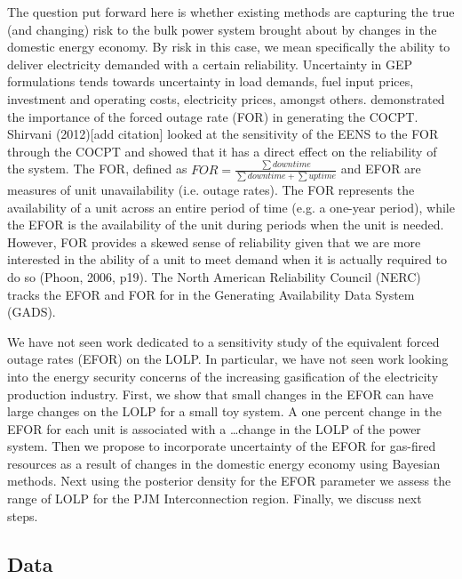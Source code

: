 \documentclass[10pt]{amsart}
\begin{document}
	The question put forward here is whether existing methods are capturing the true (and changing) risk to the bulk power system brought about by changes in the domestic energy economy. 
	By risk in this case, we mean specifically the ability to deliver electricity demanded with a certain reliability. 
	Uncertainty in GEP formulations tends towards uncertainty in load demands, fuel input prices, investment and operating costs, electricity prices, amongst others.
	\parencite{} demonstrated the importance of the forced outage rate (FOR) in generating the COCPT. 
	Shirvani (2012)[add citation] looked at the sensitivity of the EENS to the FOR through the COCPT and showed that it has a direct effect on the reliability of the system. 
	The FOR, defined as $FOR = \frac{\sum down time}{\sum down time + \sum up time}$ and EFOR are measures of unit unavailability (i.e. outage rates). 
	The FOR represents the availability of a unit across an entire period of time (e.g. a one-year period), while the EFOR is the availability of the unit during periods when the unit is needed.
	However, FOR provides a skewed sense of reliability given that we are more interested in the ability of a unit to meet demand when it is actually required to do so (Phoon, 2006, p19).  
	The North American Reliability Council (NERC) tracks the EFOR and FOR for in the Generating Availability Data System (GADS).
	
	We have not seen work dedicated to a sensitivity study of the equivalent forced outage rates (EFOR) on the LOLP.
	In particular, we have not seen work looking into the energy security concerns of the increasing gasification of the electricity production industry.
	First, we show that small changes in the EFOR can have large changes on the LOLP for a small toy system.
	A one percent change in the EFOR for each unit is associated with a \ldots change in the LOLP of the power system.
	Then we propose to incorporate uncertainty of the EFOR for gas-fired resources as a result of changes in the domestic energy economy using Bayesian methods.
	Next using the posterior density for the EFOR parameter we assess the range of LOLP for the PJM Interconnection region. 
	Finally, we discuss next steps. 
		
\subsection{Data}	
\end{document}
